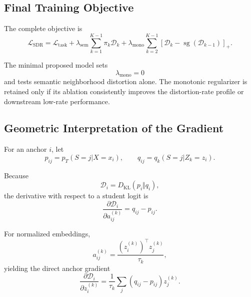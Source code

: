 \documentclass[11pt]{article}
\newcommand{\KL}{D_{\mathrm{KL}}}
\newcommand{\cL}{\mathcal{L}}
\newcommand{\cD}{\mathcal{D}}
\newcommand{\sg}{\operatorname{sg}}
\begin{document}
\subsection{Final Training Objective}

The complete objective is
\begin{equation}
\boxed{
    \cL_{\mathrm{SDR}}
    =
    \cL_{\mathrm{task}}
    +
    \lambda_{\mathrm{sem}}
    \sum_{k=1}^{K-1}
    \pi_k\cD_k
    +
    \lambda_{\mathrm{mono}}
    \sum_{k=2}^{K-1}
    [\cD_k-\sg(\cD_{k-1})]_+.
}
\end{equation}

The minimal proposed model sets
\begin{equation}
    \lambda_{\mathrm{mono}}=0
\end{equation}
and tests semantic neighborhood distortion alone.
The monotonic regularizer is retained only if its ablation consistently improves the distortion-rate profile or downstream low-rate performance.


\subsection{Geometric Interpretation of the Gradient}

For an anchor $i$, let
\begin{equation}
    p_{ij}=p_T(S=j|X=x_i),
    \qquad
    q_{ij}=q_k(S=j|Z_k=z_i).
\end{equation}

Because
\begin{equation}
    \cD_i
    =
    \KL(p_i\Vert q_i),
\end{equation}
the derivative with respect to a student logit is
\begin{equation}
\boxed{
    \frac{\partial\cD_i}
    {\partial a_{ij}^{(k)}}
    =
    q_{ij}-p_{ij}.
}
\end{equation}

For normalized embeddings,
\begin{equation}
    a_{ij}^{(k)}
    =
    \frac{
        (z_i^{(k)})^\top z_j^{(k)}
    }{\tau_k},
\end{equation}
yielding the direct anchor gradient
\begin{equation}
\boxed{
    \frac{\partial\cD_i}
    {\partial z_i^{(k)}}
    =
    \frac{1}{\tau_k}
    \sum_j
    (q_{ij}-p_{ij})z_j^{(k)}.
}
\label{eq:geometry-gradient}
\end{equation}
\end{document}

